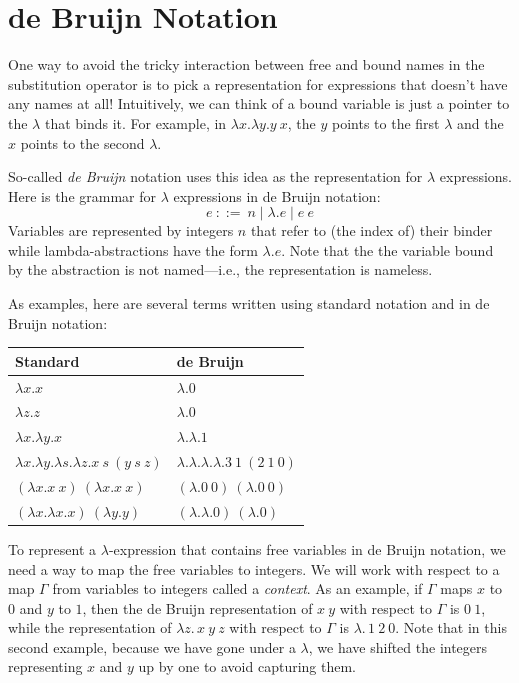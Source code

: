 % 

\section{de Bruijn Notation}

One way to avoid the tricky interaction between free and bound names in the substitution operator
is to pick a representation for expressions that doesn't have any names at all! Intuitively, we can
think of a bound variable is just a pointer to the $\lambda$ that binds it. For example, in
$\lambda x.\lambda y.y\ x$, the $y$ points to the first $\lambda$ and the $x$ points to the second
$\lambda$.

So-called \emph{de Bruijn} notation uses this idea as the representation for $\lambda$ expressions.
Here is the grammar for $\lambda$ expressions in de Bruijn notation:
\[
  e\ ::=\ n\mid\lambda.e\mid e\ e
\]
Variables are represented by integers $n$ that refer to (the index of) their binder while
lambda-abstractions have the form $\lambda.e$. Note that the the variable bound by the abstraction
is not named---i.e., the representation is nameless.

As examples, here are several terms written using standard notation and in de Bruijn notation:
\begin{center}
\begin{tabular}{|l|l|}
  \hline
  Standard & de Bruijn\\\hline
  $\lambda x.x$ & $\lambda.0$\\
  $\lambda z.z$ & $\lambda.0$\\
  $\lambda x.\lambda y.x$ & $\lambda.\lambda.1$\\
  $\lambda x.\lambda y.\lambda s.\lambda z.x\ s\ (y\ s\ z)$ & $\lambda.\lambda.\lambda.\lambda.3\ 1\ (2\ 1\ 0)$\\
  $(\lambda x.x\ x)\ (\lambda x.x\ x)$ & $(\lambda.0\ 0)\ (\lambda.0\ 0)$\\
  $(\lambda x.\lambda x.x)\ (\lambda y.y)$ & $(\lambda.\lambda.0)\ (\lambda.0)$\\\hline
\end{tabular}
\end{center}

To represent a $\lambda$-expression that contains free variables in de Bruijn notation, we need a
way to map the free variables to integers. We will work with respect to a map $\Gamma$ from
variables to integers called a \emph{context}. As an example, if $\Gamma$ maps $x$ to $0$ and $y$ to
$1$, then the de Bruijn representation of $x\ y$ with respect to $\Gamma$ is $0\ 1$, while the
representation of $\lambda z.\,x\ y\ z$ with respect to $\Gamma$ is $\lambda.\,1\ 2\ 0$. Note that
in this second example, because we have gone under a $\lambda$, we have shifted the integers
representing $x$ and $y$ up by one to avoid capturing them.

